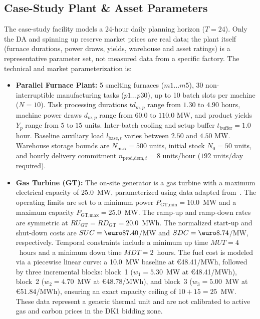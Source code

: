 \documentclass[5p,times,twocolumn]{elsarticle}
\begin{document}
\subsection{Case-Study Plant \& Asset Parameters}
\label{sec:params}
The case-study facility models a 24-hour daily planning horizon ($T=24$). Only the DA and spinning up reserve market prices are real data; the plant itself (furnace durations, power draws, yields, warehouse and asset ratings) is a representative parameter set, not measured data from a specific factory. The technical and market parameterization is:
\begin{itemize}
    \item \textbf{Parallel Furnace Plant:} 5 smelting furnaces ($m1 \dots m5$), 30 non-interruptible manufacturing tasks ($p1 \dots p30$), up to 10 batch slots per machine ($N=10$). Task processing durations $td_{m,p}$ range from $1.30$ to $4.90$ hours, machine power draws $d_{m,p}$ range from $60.0$ to $110.0$ MW, and product yields $Y_p$ range from $5$ to $15$ units. Inter-batch cooling and setup buffer $t_{\text{buffer}} = 1.0$ hour. Baseline auxiliary load $l_{\text{base},t}$ varies between $2.50$ and $4.50$ MW. Warehouse storage bounds are $N_{\text{max}} = 500$ units, initial stock $N_0 = 50$ units, and hourly delivery commitment $n_{\text{prod,dem},t} = 8$ units/hour ($192$ units/day required).
   \item \textbf{Gas Turbine (GT):} The on-site generator is a gas turbine with a maximum electrical capacity of 25.0~MW, parameterized using data adapted from~\cite{Khaloie2021rk}. The operating limits are set to a minimum power $P_{\text{GT,min}}=10.0$~MW and a maximum capacity $P_{\text{GT,max}}=25.0$~MW. The ramp-up and ramp-down rates are symmetric at $RU_{\text{GT}}=RD_{\text{GT}}=20.0$~MWh. The normalized start-up and shut-down costs are $SUC=\text{\euro}87.40$/MW and $SDC=\text{\euro}8.74$/MW, respectively. Temporal constraints include a minimum up time $MUT=4$~hours and a minimum down time $MDT=2$~hours. The fuel cost is modeled via a piecewise linear curve: a 10.0~MW baseline at \euro48.41/MWh, followed by three incremental blocks: block~1 ($w_1=5.30$~MW at \euro48.41/MWh), block~2 ($w_2=4.70$~MW at \euro48.78/MWh), and block~3 ($w_3=5.00$~MW at \euro51.84/MWh), ensuring an exact capacity ceiling of $10+15=25$~MW. These data represent a generic thermal unit and are not calibrated to active gas and carbon prices in the DK1 bidding zone.


\end{itemize}
\end{document}
